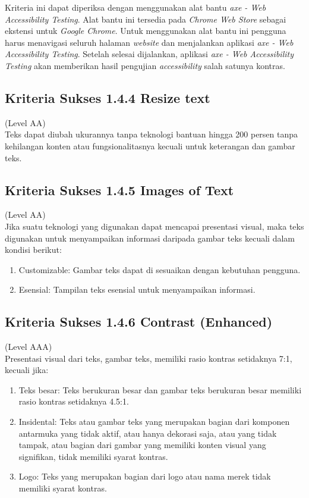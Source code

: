 Kriteria ini dapat diperiksa dengan menggunakan alat bantu \textit{axe - Web Accessibility Testing}. Alat bantu ini tersedia pada \textit{Chrome Web Store} sebagai ekstensi untuk \textit{Google Chrome}. Untuk menggunakan alat bantu ini pengguna harus menavigasi seluruh halaman \textit{website} dan menjalankan aplikasi \textit{axe - Web Accessibility Testing}. Setelah selesai dijalankan, aplikasi \textit{axe - Web Accessibility Testing} akan memberikan hasil pengujian \textit{accessibility} salah satunya kontras.

\subsection{Kriteria Sukses 1.4.4 Resize text}
\label{subsec:kriteria_1.4.4}
(Level AA) \\

Teks dapat diubah ukurannya tanpa teknologi bantuan hingga 200 persen tanpa kehilangan konten atau fungsionalitasnya kecuali untuk keterangan dan gambar teks.

\subsection{Kriteria Sukses 1.4.5 Images of Text}
\label{subsec:kriteria_1.4.5}
(Level AA) \\

Jika suatu teknologi yang digunakan dapat mencapai presentasi visual, maka teks digunakan untuk menyampaikan informasi daripada gambar teks kecuali dalam kondisi berikut:

\begin{enumerate}
	\item Customizable: Gambar teks dapat di sesuaikan dengan kebutuhan pengguna.
	\item Esensial: Tampilan teks esensial untuk menyampaikan informasi.
\end{enumerate}

\subsection{Kriteria Sukses 1.4.6 Contrast (Enhanced)}
\label{subsec:kriteria_1.4.6}
(Level AAA) \\

Presentasi visual dari teks, gambar teks, memiliki rasio kontras setidaknya 7:1, kecuali jika:

\begin{enumerate}
	\item Teks besar: Teks berukuran besar dan gambar teks berukuran besar memiliki rasio kontras setidaknya 4.5:1.
	\item Insidental: Teks atau gambar teks yang merupakan bagian dari komponen antarmuka yang tidak aktif, atau hanya dekorasi saja, atau yang tidak tampak, atau bagian dari gambar yang memiliki konten visual yang signifikan, tidak memiliki syarat kontras.
	\item Logo: Teks yang merupakan bagian dari logo atau nama merek tidak memiliki syarat kontras.
\end{enumerate}

